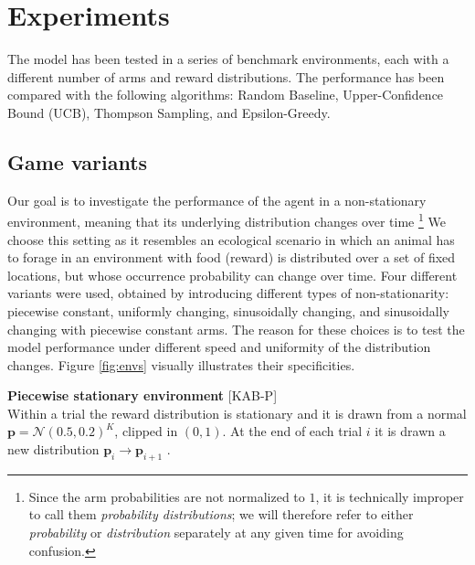 \section{Experiments}

The model has been tested in a series of benchmark environments, each with a different number of arms and reward distributions. The performance has been compared with the following algorithms: Random Baseline, Upper-Confidence Bound (UCB), Thompson Sampling, and Epsilon-Greedy.

\subsection{Game variants}\label{sec:envs}

\noindent Our goal is to investigate the performance of the agent in a non-stationary environment, meaning that its underlying distribution changes over time \footnote{Since the arm probabilities are not normalized to $1$, it is
technically improper to call them \textit{probability distributions}; we will therefore refer to either \textit{probability} or \textit{distribution} separately at any given time for avoiding confusion.}
We choose this setting as it resembles an ecological scenario in which an animal has to forage in an environment with food (reward) is distributed over a set of fixed locations, but whose occurrence probability can change over time.
Four different variants were used, obtained by introducing different types of non-stationarity: piecewise constant, uniformly changing, sinusoidally changing, and sinusoidally changing with piecewise constant arms.
The reason for these choices is to test the model performance under different speed and uniformity of the distribution changes.
Figure \ref{fig:envs} visually illustrates their specificities.

\hfill \break
\noindent \textbf{Piecewise stationary environment} [\textsc{KAB-P}]\\ Within a trial the reward distribution is stationary and it is drawn from a normal $\mathbf{p}=\mathcal{N}(0.5, 0.2)^{K}$, clipped in $(0, 1)$. At the end of each trial $i$ it is drawn a new distribution $\mathbf{\mathbf{p}}_{i} \to \mathbf{\mathbf{p}}_{i+1}$ \cite{qiForcedExplorationBandit2023}.

